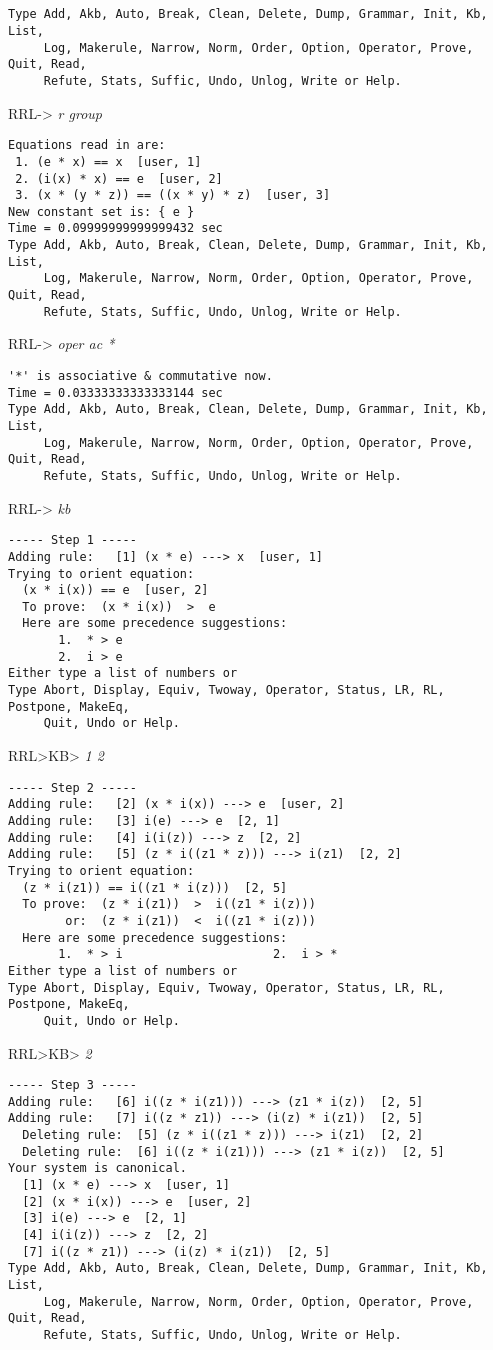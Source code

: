 \small
\tt
\begin{verbatim}

Type Add, Akb, Auto, Break, Clean, Delete, Dump, Grammar, Init, Kb, List,
     Log, Makerule, Narrow, Norm, Order, Option, Operator, Prove, Quit, Read,
     Refute, Stats, Suffic, Undo, Unlog, Write or Help.
\end{verbatim}
RRL-> {\em r group}
\begin{verbatim}
Equations read in are:
 1. (e * x) == x  [user, 1]
 2. (i(x) * x) == e  [user, 2]
 3. (x * (y * z)) == ((x * y) * z)  [user, 3]
New constant set is: { e }
Time = 0.09999999999999432 sec
Type Add, Akb, Auto, Break, Clean, Delete, Dump, Grammar, Init, Kb, List,
     Log, Makerule, Narrow, Norm, Order, Option, Operator, Prove, Quit, Read,
     Refute, Stats, Suffic, Undo, Unlog, Write or Help.
\end{verbatim}
RRL-> {\em oper ac *}
\begin{verbatim}
'*' is associative & commutative now.
Time = 0.03333333333333144 sec
Type Add, Akb, Auto, Break, Clean, Delete, Dump, Grammar, Init, Kb, List,
     Log, Makerule, Narrow, Norm, Order, Option, Operator, Prove, Quit, Read,
     Refute, Stats, Suffic, Undo, Unlog, Write or Help.
\end{verbatim}
RRL-> {\em kb}
\begin{verbatim}
----- Step 1 -----
Adding rule:   [1] (x * e) ---> x  [user, 1]
Trying to orient equation: 
  (x * i(x)) == e  [user, 2]
  To prove:  (x * i(x))  >  e
  Here are some precedence suggestions:
       1.  * > e
       2.  i > e
Either type a list of numbers or
Type Abort, Display, Equiv, Twoway, Operator, Status, LR, RL, Postpone, MakeEq,
     Quit, Undo or Help.
\end{verbatim}
RRL>KB> {\em 1 2}
\begin{verbatim}
----- Step 2 -----
Adding rule:   [2] (x * i(x)) ---> e  [user, 2]
Adding rule:   [3] i(e) ---> e  [2, 1]
Adding rule:   [4] i(i(z)) ---> z  [2, 2]
Adding rule:   [5] (z * i((z1 * z))) ---> i(z1)  [2, 2]
Trying to orient equation: 
  (z * i(z1)) == i((z1 * i(z)))  [2, 5]
  To prove:  (z * i(z1))  >  i((z1 * i(z)))
        or:  (z * i(z1))  <  i((z1 * i(z)))
  Here are some precedence suggestions:
       1.  * > i                     2.  i > *
Either type a list of numbers or
Type Abort, Display, Equiv, Twoway, Operator, Status, LR, RL, Postpone, MakeEq,
     Quit, Undo or Help.
\end{verbatim}
RRL>KB> {\em 2}
\begin{verbatim}
----- Step 3 -----
Adding rule:   [6] i((z * i(z1))) ---> (z1 * i(z))  [2, 5]
Adding rule:   [7] i((z * z1)) ---> (i(z) * i(z1))  [2, 5]
  Deleting rule:  [5] (z * i((z1 * z))) ---> i(z1)  [2, 2]
  Deleting rule:  [6] i((z * i(z1))) ---> (z1 * i(z))  [2, 5]
Your system is canonical.
  [1] (x * e) ---> x  [user, 1]
  [2] (x * i(x)) ---> e  [user, 2]
  [3] i(e) ---> e  [2, 1]
  [4] i(i(z)) ---> z  [2, 2]
  [7] i((z * z1)) ---> (i(z) * i(z1))  [2, 5]
Type Add, Akb, Auto, Break, Clean, Delete, Dump, Grammar, Init, Kb, List,
     Log, Makerule, Narrow, Norm, Order, Option, Operator, Prove, Quit, Read,
     Refute, Stats, Suffic, Undo, Unlog, Write or Help.
\end{verbatim}
